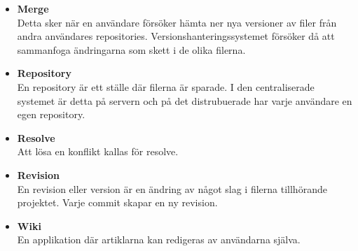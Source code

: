 \begin{itemize}
	\item \textbf{Merge}
	\\Detta sker när en användare försöker hämta ner nya versioner av filer från andra användares repositories. Versionshanteringssystemet försöker då att sammanfoga ändringarna som skett i de olika filerna.
			
	\item \textbf{Repository}
	\\En repository är ett ställe där filerna är sparade. I den centraliserade systemet är detta på servern och på det distrubuerade har varje användare en egen repository.

	\item \textbf{Resolve}
	\\Att lösa en konflikt kallas för resolve.
	
	\item \textbf{Revision}
	\\En revision eller version är en ändring av något slag i filerna tillhörande projektet. Varje commit skapar en ny revision.
	
	\item \textbf{Wiki} \\
	En applikation där artiklarna kan redigeras av användarna själva.
\end{itemize}

